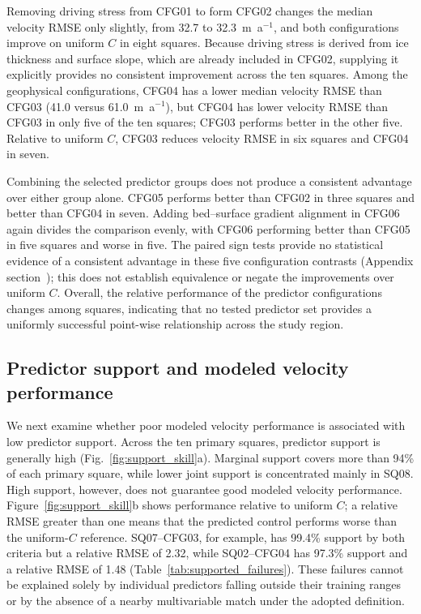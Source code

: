 \documentclass[review,jog]{igs}
\begin{document}
Removing driving stress from CFG01 to form CFG02 changes the median velocity
RMSE only slightly, from 32.7 to 32.3~m~a$^{-1}$, and both configurations
improve on uniform $C$ in eight squares. Because driving stress is derived from
ice thickness and surface slope, which are already included in CFG02, supplying
it explicitly provides no consistent improvement across the ten squares. Among the geophysical configurations, CFG04 has a lower median velocity RMSE than CFG03 (41.0 versus 61.0~m~a$^{-1}$), but CFG04 has lower velocity RMSE than CFG03 in only five of the ten squares; CFG03 performs better in the other five. Relative to uniform $C$, CFG03 reduces velocity RMSE in six squares and CFG04 in seven.


Combining the selected predictor groups does not produce a consistent advantage
over either group alone. CFG05 performs better than CFG02 in three squares and
better than CFG04 in seven. Adding bed--surface gradient alignment in CFG06
again divides the comparison evenly, with CFG06 performing better than CFG05
in five squares and worse in five. The paired sign tests provide no statistical
evidence of a consistent advantage in these five configuration contrasts
(Appendix section~); this does not establish
equivalence or negate the improvements over uniform $C$. Overall, the relative
performance of the predictor configurations changes among squares, indicating
that no tested predictor set provides a uniformly successful point-wise
relationship across the study region.

\subsection{Predictor support and modeled velocity performance}

We next examine whether poor modeled velocity performance is associated with low predictor support. Across the ten primary squares, predictor support is
generally high (Fig.~\ref{fig:support_skill}a). Marginal support covers more
than 94\% of each primary square, while lower joint support is concentrated
mainly in SQ08. High support, however, does not guarantee good modeled velocity performance. Figure~\ref{fig:support_skill}b shows performance relative to uniform $C$; a relative RMSE greater than one means that the predicted control performs worse than the uniform-$C$ reference. SQ07--CFG03, for example, has 99.4\% support by both criteria but a relative RMSE of 2.32, while SQ02--CFG04 has 97.3\% support and a relative RMSE of 1.48 (Table~\ref{tab:supported_failures}). These failures cannot be explained solely by individual predictors falling outside their training ranges or by the absence of a nearby multivariable match under the adopted definition.
\end{document}
